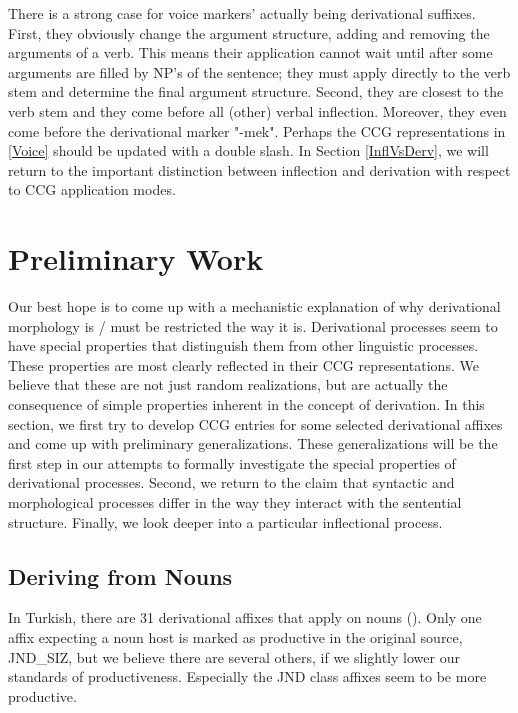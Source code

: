 \documentclass[11pt]{article} %
\begin{document}
There is a strong case for voice markers' actually being derivational suffixes. First, they obviously change the argument structure, adding and removing the arguments of a verb. This means their application cannot wait until after some arguments are filled by NP's of the sentence; they must apply directly to the verb stem and determine the final argument structure. Second, they are closest to the verb stem and they come before all (other) verbal inflection. Moreover, they even come before the derivational marker "-mek". Perhaps the CCG representations in \ref{Voice} should be updated with a double slash. In Section \ref{InflVsDerv}, we will return to the important distinction between inflection and derivation with respect to CCG application modes.

\newpage

\section{Preliminary Work}

\label{PrelimWork}

Our best hope is to come up with a mechanistic explanation of why derivational morphology is / must be restricted the way it is. Derivational processes seem to have special properties that distinguish them from other linguistic processes. These properties are most clearly reflected in their CCG representations. We believe that these are not just random realizations, but are actually the consequence of simple properties inherent in the concept of derivation. In this section, we first try to develop CCG entries for some selected derivational affixes and come up with preliminary generalizations. These generalizations will be the first step in our attempts to formally investigate the special properties of derivational processes. Second, we return to the claim that syntactic and morphological processes differ in the way they interact with the sentential structure. Finally, we look deeper into a particular inflectional process. \\

\subsection{Deriving from Nouns}

In Turkish, there are 31 derivational affixes that apply on nouns (\citet{Bozsahin2018}). Only one affix expecting a noun host is marked as productive in the original source, JND\_SIZ, but we believe there are several others, if we slightly lower our standards of productiveness. Especially the JND class affixes seem to be more productive. \\
\end{document}
